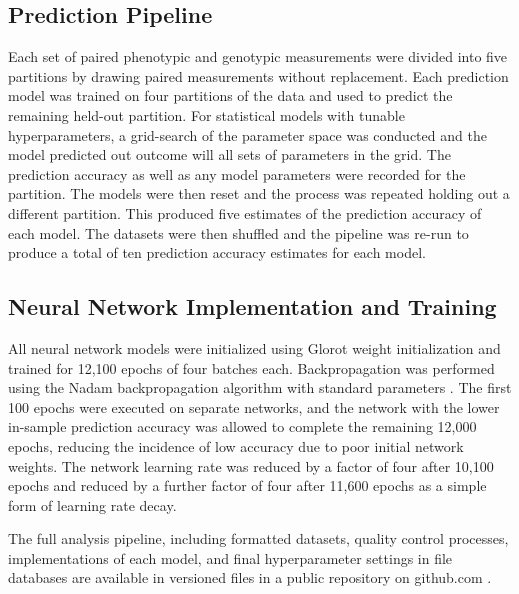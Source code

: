 \subsection*{Prediction Pipeline}


Each set of paired phenotypic and genotypic measurements were divided into 
five partitions by drawing paired measurements without replacement. Each prediction model
was trained on four partitions of the data and used to predict the remaining held-out partition. 
For statistical models with tunable hyperparameters, a grid-search of the parameter 
space was conducted and the model predicted out outcome will all sets of parameters in the grid.
The prediction accuracy as well as any model parameters were recorded for the partition. The models 
were then reset and the process was repeated holding out a different partition. This produced 
five estimates of the prediction accuracy of each model. The datasets were then shuffled 
and the pipeline was re-run to produce a total of ten prediction accuracy estimates for each model. 

\subsection{Neural Network Implementation and Training}

All neural network models were initialized using Glorot weight initialization \citep{glorot2010} 
and trained for 12,100 epochs of four batches each. Backpropagation was performed using the 
Nadam backpropagation algorithm with standard parameters \citep{dozat2015}. 
The first 100 epochs were executed on separate networks, and the network with the lower 
in-sample prediction accuracy was allowed to complete the remaining 12,000 epochs, 
reducing the incidence of low accuracy due to poor initial network weights.
The network learning rate was reduced by a factor of four after 10,100 epochs and reduced by a further
factor of four after 11,600 epochs as a simple form of learning rate decay.

The full analysis pipeline, including formatted datasets, quality control processes, 
implementations of each model, and final hyperparameter settings in file databases 
are available in versioned files in a public repository on github.com \citep{mcdowell2016}.

